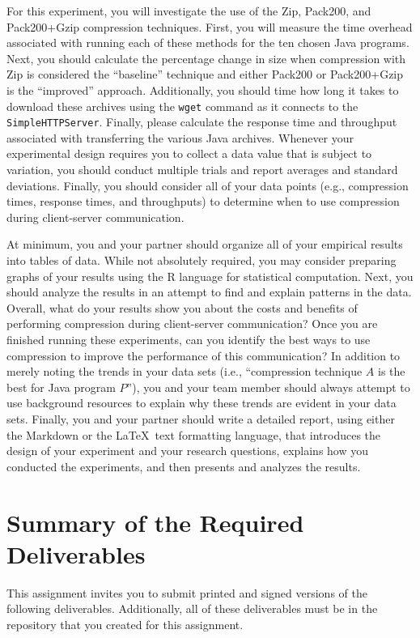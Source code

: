 For this experiment, you will investigate the use of the Zip, Pack200, and Pack200+Gzip compression techniques. First,
you will measure the time overhead associated with running each of these methods for the ten chosen Java programs. Next,
you should calculate the percentage change in size when compression with Zip is considered the ``baseline'' technique
and either Pack200 or Pack200+Gzip is the ``improved'' approach. Additionally, you should time how long it takes to
download these archives using the {\tt wget} command as it connects to the {\tt SimpleHTTPServer}. Finally, please
calculate the response time and throughput associated with transferring the various Java archives. Whenever your
experimental design requires you to collect a data value that is subject to variation, you should conduct multiple
trials and report averages and standard deviations. Finally, you should consider all of your data points (e.g.,
compression times, response times, and throughputs) to determine when to use compression during client-server
communication.

At minimum, you and your partner should organize all of your empirical results into tables of data. While not absolutely
required, you may consider preparing graphs of your results using the R language for statistical computation.  Next, you
should analyze the results in an attempt to find and explain patterns in the data. Overall, what do your results show
you about the costs and benefits of performing compression during client-server communication? Once you are finished
running these experiments, can you identify the best ways to use compression to improve the performance of this
communication?  In addition to merely noting the trends in your data sets (i.e., ``compression technique $A$ is the best
for Java program $P$''), you and your team member should always attempt to use background resources to explain why these
trends are evident in your data sets.  Finally, you and your partner should write a detailed report, using either the
Markdown or the \LaTeX~text formatting language, that introduces the design of your experiment and your research
questions, explains how you conducted the experiments, and then presents and analyzes the results.

\section*{Summary of the Required Deliverables}

This assignment invites you to submit printed and signed versions of the following deliverables. Additionally,
all of these deliverables must be in the repository that you created for this assignment.

